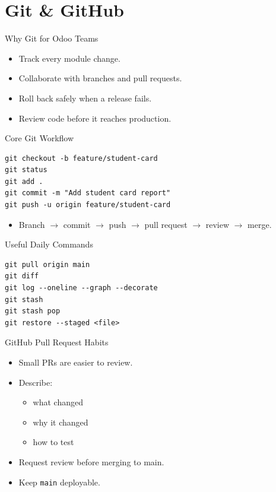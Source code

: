 \section{Git \& GitHub}

\begin{frame}[fragile]{Why Git for Odoo Teams}
	\begin{itemize}
		\item Track every module change.
		\item Collaborate with branches and pull requests.
		\item Roll back safely when a release fails.
		\item Review code before it reaches production.
	\end{itemize}
\end{frame}

\begin{frame}[fragile]{Core Git Workflow}
\begin{lstlisting}[style=bash]
git checkout -b feature/student-card
git status
git add .
git commit -m "Add student card report"
git push -u origin feature/student-card
\end{lstlisting}
	\begin{itemize}
		\item Branch $\rightarrow$ commit $\rightarrow$ push $\rightarrow$ pull request $\rightarrow$ review $\rightarrow$ merge.
	\end{itemize}
\end{frame}

\begin{frame}[fragile]{Useful Daily Commands}
\begin{lstlisting}[style=bash]
git pull origin main
git diff
git log --oneline --graph --decorate
git stash
git stash pop
git restore --staged <file>
\end{lstlisting}
\end{frame}

\begin{frame}[fragile]{GitHub Pull Request Habits}
	\begin{itemize}
		\item Small PRs are easier to review.
		\item Describe:
		\begin{itemize}
			\item what changed
			\item why it changed
			\item how to test
		\end{itemize}
		\item Request review before merging to main.
		\item Keep \texttt{main} deployable.
	\end{itemize}
\end{frame}

